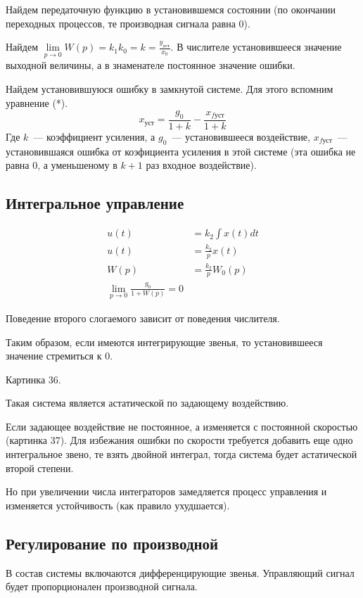 Найдем передаточную функцию в установившемся состоянии (по окончании переходных процессов, те производная сигнала равна 0).

Найдем $\lim\limits_{p\rightarrow0}W(p)=k_1k_0=k=\frac{y_{\text{уст}}}{x_0}$. В числителе установившееся значение выходной величины, а в знаменателе постоянное значение ошибки.

Найдем установившуюся ошибку в замкнутой системе. Для этого вспомним уравнение (*).
$$
	x_{\text{уст}}=\frac{g_0}{1+k}-\frac{x_{f\text{уст}}}{1+k}
$$
Где $k$~--- коэффициент усиления, а $g_0$~--- установившееся воздействие, $x_{f\text{уст}}$~--- установившаяся ошибка от коэфициента усиления в этой системе (эта ошибка не равна 0, а уменьшеному в $k+1$ раз входное воздействие).

\subsection{Интегральное управление}
\begin{align*}
	u(t) &= k_2\int{}x(t)dt\\
	u(t) &= \frac{k_2}{p}x(t)\\
	W(p) &= \frac{k_2}pW_0(p)\\
	\lim\limits_{p\rightarrow0}\frac{g_0}{1+W(p)}=0
\end{align*}

Поведение второго слогаемого зависит от поведения числителя.

Таким образом, если имеются интегрирующие звенья, то установившееся значение стремиться к 0.

Картинка 36.

Такая система является астатической по задающему воздействию.

Если задающее воздействие не постоянное, а изменяется с постоянной скоростью (картинка 37). Для избежания ошибки по скорости требуется добавить еще одно интегральное звено, те взять двойной интеграл, тогда система будет астатической второй степени.

Но при увеличении числа интеграторов замедляется процесс управления и изменяется устойчивость (как правило ухудшается).

\subsection{Регулирование по производной}
В состав системы включаются дифференцирующие звенья. Управляющий сигнал будет пропорционален производной сигнала.

